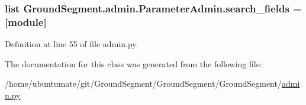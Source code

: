 \hypertarget{class_ground_segment_1_1admin_1_1_parameter_admin_aa50da80cc9ee5d5dcbad140ad78d5cf7}{}
\subsubsection[{search\+\_\+fields}]{\setlength{\rightskip}{0pt plus 5cm}list Ground\+Segment.\+admin.\+Parameter\+Admin.\+search\+\_\+fields = \mbox{[}\textquotesingle{}module\textquotesingle{}\mbox{]}\hspace{0.3cm}{\ttfamily [static]}}\label{class_ground_segment_1_1admin_1_1_parameter_admin_aa50da80cc9ee5d5dcbad140ad78d5cf7}


Definition at line 55 of file admin.\+py.



The documentation for this class was generated from the following file\+:\begin{DoxyCompactItemize}
\item 
/home/ubuntumate/git/\+Ground\+Segment/\+Ground\+Segment/\+Ground\+Segment/\hyperlink{admin_8py}{admin.\+py}\end{DoxyCompactItemize}
